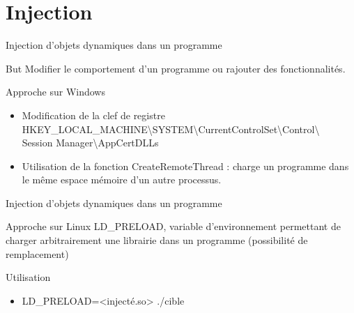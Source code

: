 \section{Injection}

\begin{frame}{Injection d'objets dynamiques dans un programme}
	\begin{alertblock}{But}
	Modifier le comportement d'un programme ou rajouter des fonctionnalités.
	\end{alertblock}
	
    \begin{block}{Approche sur Windows}
    	\begin{itemize}
		 \item Modification de la clef de registre HKEY\_LOCAL\_MACHINE\textbackslash SYSTEM\textbackslash	  CurrentControlSet\textbackslash Control\textbackslash \\ Session Manager\textbackslash AppCertDLLs
		
		\item Utilisation de la fonction CreateRemoteThread : charge un programme dans le même espace mémoire
		d'un autre processus.
	    \end{itemize}
    \end{block}	
		
	\end{frame}

\begin{frame}{Injection d'objets dynamiques dans un programme}

	\begin{block}{Approche sur Linux}
	LD\_PRELOAD, variable d'environnement permettant de charger arbitrairement une librairie dans un programme 	(possibilité de remplacement)
	
	
	\begin{block}{Utilisation}
    	\begin{itemize}
		\item LD\_PRELOAD=<injecté.so> ./cible
	    \end{itemize}
	\end{block}
	
	
	\end{block}
	
\end{frame}

